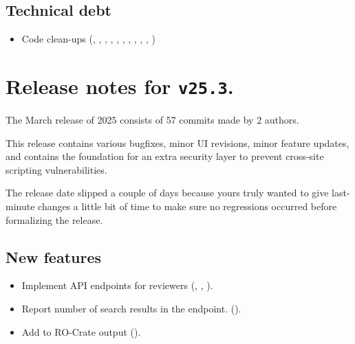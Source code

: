 \subsection*{Technical debt}
\begin{itemize}
\item{Code clean-ups (,
    ,
    ,
    ,
    ,
    ,
    ,
    ,
    ,
    ,
    )}
\end{itemize}

\section*{Release notes for \texttt{v25.3}.}

  The March release of 2025 consists of 57 commits made by 2 authors.

  This release contains various bugfixes, minor UI revisions, minor feature
  updates, and contains the foundation for an extra security layer to prevent
  cross-site scripting vulnerabilities.

  The release date slipped a couple of days because yours truly wanted to
  give last-minute changes a little bit of time to make sure no regressions
  occurred before formalizing the release.

\subsection*{New features}
\begin{itemize}
\item{Implement API endpoints for reviewers
    (,
    ,
    ).}
\item{Report number of search results in the  endpoint.
    ().}
\item{Add  to RO-Crate output
    ().}
\end{itemize}

